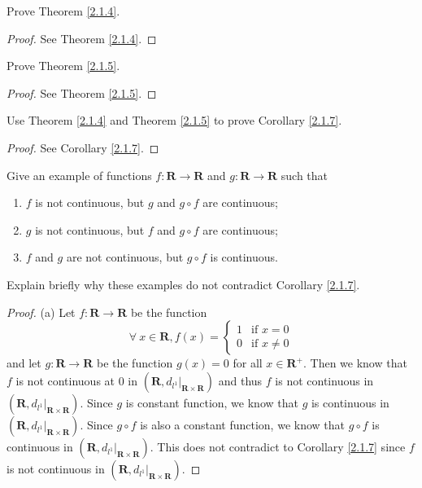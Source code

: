 \exercisesection

\begin{exercise}\label{ex 2.1.1}
    Prove Theorem \ref{2.1.4}.
\end{exercise}

\begin{proof}
    See Theorem \ref{2.1.4}.
\end{proof}

\begin{exercise}\label{ex 2.1.2}
    Prove Theorem \ref{2.1.5}.
\end{exercise}

\begin{proof}
    See Theorem \ref{2.1.5}.
\end{proof}

\begin{exercise}\label{ex 2.1.3}
    Use Theorem \ref{2.1.4} and Theorem \ref{2.1.5} to prove Corollary \ref{2.1.7}.
\end{exercise}

\begin{proof}
    See Corollary \ref{2.1.7}.
\end{proof}

\begin{exercise}\label{ex 2.1.4}
    Give an example of functions \(f : \mathbf{R} \to \mathbf{R}\) and \(g : \mathbf{R} \to \mathbf{R}\) such that
    \begin{enumerate}
        \item \(f\) is not continuous, but \(g\) and \(g \circ f\) are continuous;
        \item \(g\) is not continuous, but \(f\) and \(g \circ f\) are continuous;
        \item \(f\) and \(g\) are not continuous, but \(g \circ f\) is continuous.
    \end{enumerate}
    Explain briefly why these examples do not contradict Corollary \ref{2.1.7}.
\end{exercise}

\begin{proof}{(a)}
    Let \(f : \mathbf{R} \to \mathbf{R}\) be the function
    \[
        \forall\ x \in \mathbf{R}, f(x) = \begin{cases}
            1 & \text{if } x = 0    \\
            0 & \text{if } x \neq 0
        \end{cases}
    \]
    and let \(g : \mathbf{R} \to \mathbf{R}\) be the function \(g(x) = 0\) for all \(x \in \mathbf{R}^+\).
    Then we know that \(f\) is not continuous at \(0\) in \((\mathbf{R}, d_{l^1}|_{\mathbf{R} \times \mathbf{R}})\) and thus \(f\) is not continuous in \((\mathbf{R}, d_{l^1}|_{\mathbf{R} \times \mathbf{R}})\).
    Since \(g\) is constant function, we know that \(g\) is continuous in \((\mathbf{R}, d_{l^1}|_{\mathbf{R} \times \mathbf{R}})\).
    Since \(g \circ f\) is also a constant function, we know that \(g \circ f\) is continuous in \((\mathbf{R}, d_{l^1}|_{\mathbf{R} \times \mathbf{R}})\).
    This does not contradict to Corollary \ref{2.1.7} since \(f\) is not continuous in \((\mathbf{R}, d_{l^1}|_{\mathbf{R} \times \mathbf{R}})\).
\end{proof}

